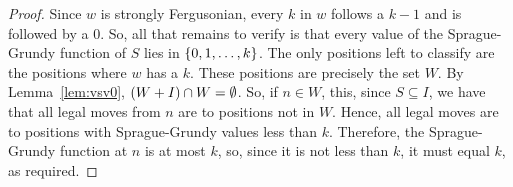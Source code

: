 \documentclass[english,12pt]{article}
\begin{document}
\begin{proof}
Since $w$ is strongly Fergusonian, every $k$ in $w$ follows a $k-1$ and is followed by a $0$.  So, all that remains to verify is that every value of the Sprague-Grundy function of $S$ lies in $\left\{0,1,\ldots, k\right\}$.  The only positions left to classify are the positions where $w$ has a $k$.  These positions are precisely the set $W$.
By Lemma~\ref{lem:vsv0}, $\left(W+I\right)\cap W=\emptyset$.
So, if $n\in W$, this, since $S\subseteq I$, we have that all legal moves from $n$ are to positions not in $W$.  Hence, all legal moves are to positions with Sprague-Grundy values less than $k$.  Therefore, the Sprague-Grundy function at $n$ is at most $k$, so, since it is not less than $k$, it must equal $k$, as required.


\end{proof}
\end{document}
